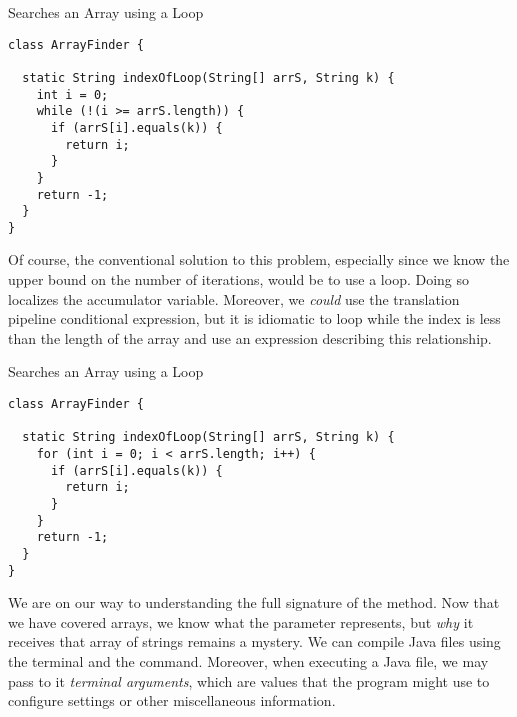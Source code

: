 \begin{cl}{Searches an Array using a  Loop}
\begin{lstlisting}[language=MyJava]
class ArrayFinder {

  static String indexOfLoop(String[] arrS, String k) {
    int i = 0;
    while (!(i >= arrS.length)) {
      if (arrS[i].equals(k)) { 
        return i; 
      }
    }
    return -1;
  }
}
\end{lstlisting}
\end{cl}

Of course, the conventional solution to this problem, especially since we know the upper bound on the number of iterations, would be to use a  loop. Doing so localizes the accumulator variable. Moreover, we \textit{could} use the translation pipeline conditional expression, but it is idiomatic to loop while the index is less than the length of the array and use an expression describing this relationship.

\begin{cl}{Searches an Array using a  Loop}
\begin{lstlisting}[language=MyJava]
class ArrayFinder {
  
  static String indexOfLoop(String[] arrS, String k) {
    for (int i = 0; i < arrS.length; i++) {
      if (arrS[i].equals(k)) { 
        return i; 
      }
    }
    return -1;
  }
}
\end{lstlisting}
\end{cl}

We are on our way to understanding the full signature of the  method. Now that we have covered arrays, we know what the  parameter represents, but \textit{why} it receives that array of strings remains a mystery. We can compile Java files using the terminal and the  command. Moreover, when executing a Java file, we may pass to it \textit{terminal arguments}, which are values that the program might use to configure settings or other miscellaneous information.


